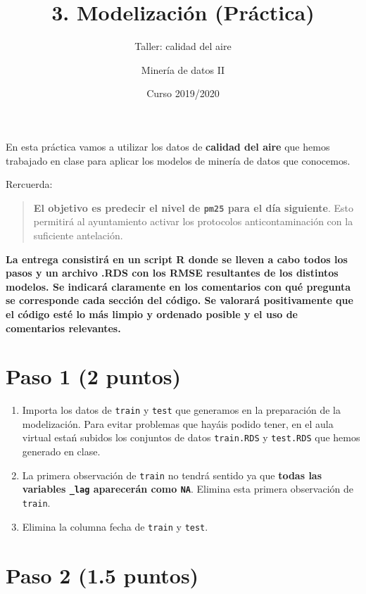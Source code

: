 \documentclass[]{article}
\title{3. Modelización (Práctica)}
\subtitle{Taller: calidad del aire}
\author{Minería de datos II}
\date{Curso 2019/2020}
\providecommand{\tightlist}{%
  \setlength{\itemsep}{0pt}\setlength{\parskip}{0pt}}
\begin{document}
\maketitle

En esta práctica vamos a utilizar los datos de \textbf{calidad del aire}
que hemos trabajado en clase para aplicar los modelos de minería de
datos que conocemos.

Rercuerda:

\begin{quote}
\textbf{El objetivo es predecir el nivel de \texttt{pm25} para el día
siguiente}. Esto permitirá al ayuntamiento activar los protocolos
anticontaminación con la suficiente antelación.
\end{quote}

\textbf{La entrega consistirá en un script R donde se lleven a cabo
todos los pasos y un archivo .RDS con los RMSE resultantes de los
distintos modelos. Se indicará claramente en los comentarios con qué
pregunta se corresponde cada sección del código. Se valorará
positivamente que el código esté lo más limpio y ordenado posible y el
uso de comentarios relevantes.}

\hypertarget{paso-1-2-puntos}{%
\section{Paso 1 (2 puntos)}\label{paso-1-2-puntos}}

\begin{enumerate}
\def\labelenumi{\arabic{enumi}.}
\tightlist
\item
  Importa los datos de \texttt{train} y \texttt{test} que generamos en
  la preparación de la modelización. Para evitar problemas que hayáis
  podido tener, en el aula virtual estań subidos los conjuntos de datos
  \texttt{train.RDS} y \texttt{test.RDS} que hemos generado en clase.
\item
  La primera observación de \texttt{train} no tendrá sentido ya que
  \textbf{todas las variables \texttt{\_lag} aparecerán como
  \texttt{NA}}. Elimina esta primera observación de \texttt{train}.
\item
  Elimina la columna fecha de \texttt{train} y \texttt{test}.
\end{enumerate}

\hypertarget{paso-2-1.5-puntos}{%
\section{Paso 2 (1.5 puntos)}\label{paso-2-1.5-puntos}}
\end{document}
